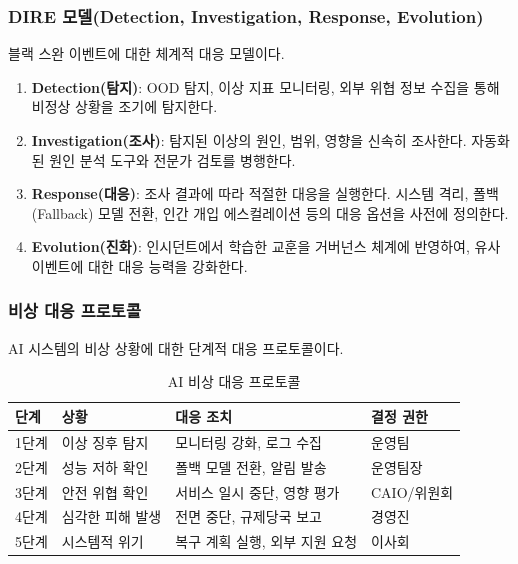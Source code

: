 \subsubsection{DIRE 모델(Detection, Investigation, Response, Evolution)}

블랙 스완 이벤트에 대한 체계적 대응 모델이다.

\begin{enumerate}
 \item \textbf{Detection(탐지)}: OOD 탐지, 이상 지표 모니터링, 외부 위협 정보 수집을 통해 비정상 상황을 조기에 탐지한다.
 \item \textbf{Investigation(조사)}: 탐지된 이상의 원인, 범위, 영향을 신속히 조사한다. 자동화된 원인 분석 도구와 전문가 검토를 병행한다.
 \item \textbf{Response(대응)}: 조사 결과에 따라 적절한 대응을 실행한다. 시스템 격리, 폴백(Fallback) 모델 전환, 인간 개입 에스컬레이션 등의 대응 옵션을 사전에 정의한다.
 \item \textbf{Evolution(진화)}: 인시던트에서 학습한 교훈을 거버넌스 체계에 반영하여, 유사 이벤트에 대한 대응 능력을 강화한다.
\end{enumerate}

\subsubsection{비상 대응 프로토콜}

AI 시스템의 비상 상황에 대한 단계적 대응 프로토콜이다.

\begin{table}[htbp]
\centering
\caption{AI 비상 대응 프로토콜}
\label{tab:20_emergency}
\begin{tabularx}{\textwidth}{p{1.5cm}p{2.5cm}Xp{3cm}}
\toprule
\textbf{단계} & \textbf{상황} & \textbf{대응 조치} & \textbf{결정 권한} \\
\midrule
1단계 & 이상 징후 탐지 & 모니터링 강화, 로그 수집 & 운영팀 \\
2단계 & 성능 저하 확인 & 폴백 모델 전환, 알림 발송 & 운영팀장 \\
3단계 & 안전 위협 확인 & 서비스 일시 중단, 영향 평가 & CAIO/위원회 \\
4단계 & 심각한 피해 발생 & 전면 중단, 규제당국 보고 & 경영진 \\
5단계 & 시스템적 위기 & 복구 계획 실행, 외부 지원 요청 & 이사회 \\
\bottomrule
\end{tabularx}
\end{table}

